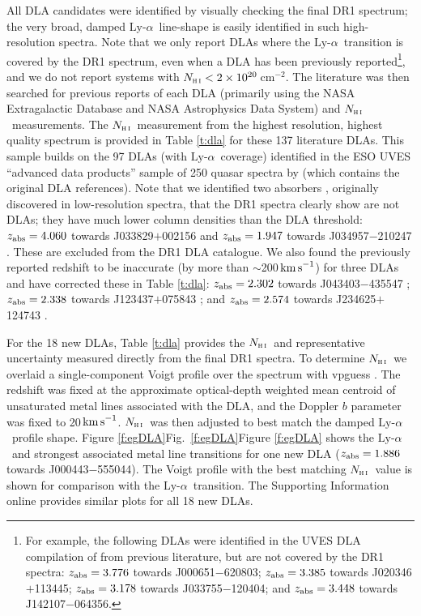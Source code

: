 \documentclass[fleqn,usenatbib,usedcolumn]{mnras}
\newcommand{\Tref}[1]{Table \ref{#1}}
\newcommand{\Fref}[1]{\ifhmode \ifnum\spacefactor=1001 Figure \ref{#1}\else Fig.\ \ref{#1}\fi \else Figure \ref{#1}\fi}
\newcommand{\kms}{\ensuremath{\textrm{km\,s}^{-1}}}
\newcommand{\pcmsq}{\ensuremath{\textrm{cm}^{-2}}}
\newcommand{\lya}{\ensuremath{\textrm{Ly-}\alpha}}
\newcommand{\zab}{\ensuremath{z_\textrm{\scriptsize abs}}}
\newcommand{\NHI}{\ensuremath{N_\textsc{h\scriptsize{\,i}}}}
\begin{document}
All DLA candidates were identified by visually checking the final DR1 spectrum; the very broad, damped \lya\ line-shape is easily identified in such high-resolution spectra. Note that we only report DLAs where the \lya\ transition is covered by the DR1 spectrum, even when a DLA has been previously reported\footnote{For example, the following DLAs were identified in the UVES DLA compilation of \citet{Zafar:2013:A141} from previous literature, but are not covered by the DR1 spectra: $\zab=3.776$ towards J000651$-$620803; $\zab=3.385$ towards J020346$+$113445; $\zab=3.178$ towards J033755$-$120404; and $\zab=3.448$ towards J142107$-$064356.}, and we do not report systems with $\NHI<2\times10^{20}$\,\pcmsq. The literature was then searched for previous reports of each DLA (primarily using the NASA Extragalactic Database and NASA Astrophysics Data System) and \NHI\ measurements. The \NHI\ measurement from the highest resolution, highest quality spectrum is provided in \Tref{t:dla} for these 137 literature DLAs. This sample builds on the 97 DLAs (with \lya\ coverage) identified in the ESO UVES ``advanced data products'' sample of 250 quasar spectra by \citet{Zafar:2013:A141} (which contains the original DLA references). Note that we identified two absorbers \citep[included in][]{Zafar:2013:A141}, originally discovered in low-resolution spectra, that the DR1 spectra clearly show are not DLAs; they have much lower column densities than the DLA threshold: $\zab=4.060$ towards J033829$+$002156 \citep{Peroux:2001:1799} and $\zab=1.947$ towards J034957$-$210247 \citep{Ellison:2001:393}. These are excluded from the DR1 DLA catalogue. We also found the previously reported redshift to be inaccurate (by more than $\sim$200\,\kms) for three DLAs and have corrected these in \Tref{t:dla}: $\zab=2.302$ towards J043403$-$435547 \citep{Ellison:2001:393}; $\zab=2.338$ towards J123437$+$075843 \citep{Zafar:2013:A141}; and $\zab=2.574$ towards J234625$+$124743 \citep{Zafar:2013:A141}.

For the 18 new DLAs, \Tref{t:dla} provides the \NHI\ and representative uncertainty measured directly from the final DR1 spectra. To determine \NHI\ we overlaid a single-component Voigt profile over the spectrum with {\sc vpguess} \citep{Liske:2014:VPGUESS}. The redshift was fixed at the approximate optical-depth weighted mean centroid of unsaturated metal lines associated with the DLA, and the Doppler $b$ parameter was fixed to 20\,\kms. \NHI\ was then adjusted to best match the damped \lya\ profile shape. \Fref{f:egDLA} shows the \lya\ and strongest associated metal line transitions for one new DLA ($\zab=1.886$ towards J000443$-$555044). The Voigt profile with the best matching \NHI\ value is shown for comparison with the \lya\ transition. The Supporting Information online provides similar plots for all 18 new DLAs.
\end{document}
